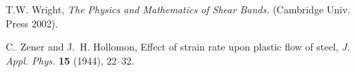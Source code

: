 \documentclass[11pt]{article}
\theoremstyle{remark}
\begin{document}
\begin{thebibliography}{10}
%
%

{\sc T.W. Wright},
{\it The Physics and Mathematics of Shear Bands.} (Cambridge Univ. Press 2002).

%


{\sc C.~Zener and J.~H. Hollomon},
Effect of strain rate upon plastic flow of steel,
{\it J. Appl. Phys.}
{\bf 15} (1944), 22--32.

\end{thebibliography}
\end{document}
